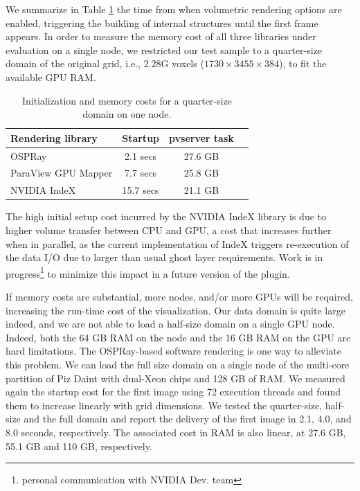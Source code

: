 \documentclass[final,5p,times,twocolumn]{elsarticle}
\begin{document}
We summarize in Table \ref{tab:firstframe-tab} the time from when volumetric rendering options are enabled, triggering the building of internal structures until the first frame appears.
In order to measure the memory cost of all three libraries under evaluation on a single node, we restricted our test sample to a quarter-size domain of the original grid, i.e., 2.28G voxels ($ 1730 \times 3455 \times 384 $), to fit the available GPU RAM.

\begin{table}[htb]
  \centering
  \caption{
    Initialization and memory costs for a quarter-size domain on one node.
  }
  \label{tab:firstframe-tab}

  \begin{tabular}{lccc}
    \hline
    Rendering library & Startup & pvserver task\\
    \hline
    OSPRay & 2.1 secs &  27.6 GB \\
    ParaView GPU Mapper & 7.7 secs &  25.8 GB \\
    NVIDIA IndeX & 15.7 secs &  21.1 GB\\
    \hline

  \end{tabular}
\end{table}

The high initial setup cost incurred by the NVIDIA IndeX library is due to higher volume transfer between CPU and GPU, a cost that increases further when in parallel, as the current
implementation of IndeX triggers re-execution of the data I/O due to larger than usual ghost layer requirements. Work is in progress\footnote{personal communication with NVIDIA Dev. team} to minimize this impact in a future version of the plugin.

If memory costs are substantial, more nodes, and/or more GPUs will be required,
increasing the run-time cost of the visualization. Our data domain is quite large
indeed, and we are not able to load a half-size domain on a single GPU node. Indeed, both
the 64 GB RAM on the node and the 16 GB RAM on the GPU are hard limitations. The OSPRay-based software rendering is one way to alleviate this problem. We can load the full size
domain on a single node of  the multi-core partition of Piz Daint with dual-Xeon
chips and 128 GB of RAM. We measured again the startup cost for the first image
using 72 execution threads and found them to increase linearly with grid dimensions.
We tested the quarter-size, half-size and the full domain and report the delivery
of the first image in 2.1, 4.0, and 8.0 seconds, respectively. The associated cost
in RAM is also linear, at 27.6 GB, 55.1 GB and 110 GB, respectively.
 
\end{document}
